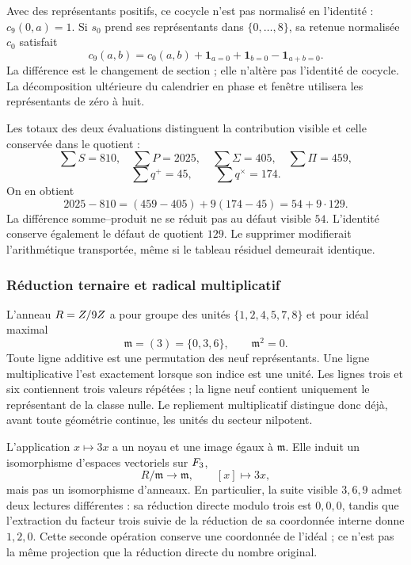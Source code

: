 Avec des représentants positifs, ce cocycle n'est pas normalisé en l'identité : \(c_9(0,a)=1\). Si \(s_0\) prend ses représentants dans \(\{0,\ldots,8\}\), sa retenue normalisée \(c_0\) satisfait
\[
 c_9(a,b)=c_0(a,b)+\mathbf1_{a=0}+\mathbf1_{b=0}-\mathbf1_{a+b=0}.
\]
La différence est le changement de section ; elle n'altère pas l'identité de cocycle. La décomposition ultérieure du calendrier en phase et fenêtre utilisera les représentants de zéro à huit.

Les totaux des deux évaluations distinguent la contribution visible et celle conservée dans le quotient :
\[
 \sum S=810,\quad\sum P=2025,\quad
 \sum\Sigma=405,\quad\sum\Pi=459,
\]
\[
 \sum q^+=45,\qquad\sum q^\times=174.
\]
On en obtient
\begin{equation}
 2025-810=(459-405)+9(174-45)=54+9\cdot129.
 \label{x_reciprocidad:eq:defecto-integrado}
\end{equation}
La différence somme--produit ne se réduit pas au défaut visible \(54\). L'identité conserve également le défaut de quotient \(129\). Le supprimer modifierait l'arithmétique transportée, même si le tableau résiduel demeurait identique.

\subsubsection{Réduction ternaire et radical multiplicatif}

L'anneau \(R=Z/9Z\) a pour groupe des unités \(\{1,2,4,5,7,8\}\) et pour idéal maximal
\[
 \mathfrak m=(3)=\{0,3,6\},\qquad\mathfrak m^2=0.
\]
Toute ligne additive est une permutation des neuf représentants. Une ligne multiplicative l'est exactement lorsque son indice est une unité. Les lignes trois et six contiennent trois valeurs répétées ; la ligne neuf contient uniquement le représentant de la classe nulle. Le repliement multiplicatif distingue donc déjà, avant toute géométrie continue, les unités du secteur nilpotent.

L'application \(x\mapsto3x\) a un noyau et une image égaux à \(\mathfrak m\). Elle induit un isomorphisme d'espaces vectoriels sur \(F_3\),
\[
 R/\mathfrak m\longrightarrow\mathfrak m,\qquad [x]\longmapsto3x,
\]
mais pas un isomorphisme d'anneaux. En particulier, la suite visible \(3,6,9\) admet deux lectures différentes : sa réduction directe modulo trois est \(0,0,0\), tandis que l'extraction du facteur trois suivie de la réduction de sa coordonnée interne donne \(1,2,0\). Cette seconde opération conserve une coordonnée de l'idéal ; ce n'est pas la même projection que la réduction directe du nombre original.

